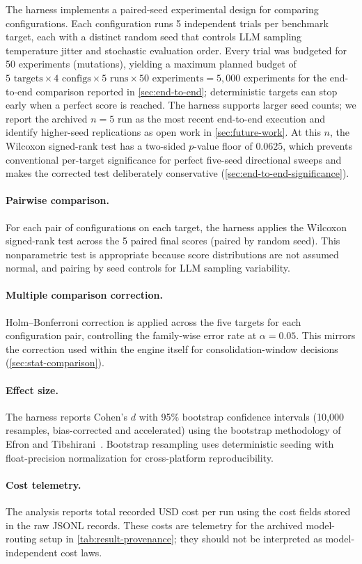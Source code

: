 The harness implements a paired-seed experimental design for comparing configurations.
Each configuration runs 5 independent trials per benchmark target, each with a distinct random seed that controls LLM sampling temperature jitter and stochastic evaluation order.
Every trial was budgeted for 50 experiments (mutations), yielding a maximum planned budget of $5 \text{ targets} \times 4 \text{ configs} \times 5 \text{ runs} \times 50 \text{ experiments} = 5{,}000$ experiments for the end-to-end comparison reported in \cref{sec:end-to-end}; deterministic targets can stop early when a perfect score is reached.
The harness supports larger seed counts; we report the archived $n = 5$ run as the most recent end-to-end execution and identify higher-seed replications as open work in \cref{sec:future-work}.
At this $n$, the Wilcoxon signed-rank test has a two-sided $p$-value floor of $0.0625$, which prevents conventional per-target significance for perfect five-seed directional sweeps and makes the corrected test deliberately conservative (\cref{sec:end-to-end-significance}).

\paragraph{Pairwise comparison.}
For each pair of configurations on each target, the harness applies the Wilcoxon signed-rank test across the 5 paired final scores (paired by random seed).
This nonparametric test is appropriate because score distributions are not assumed normal, and pairing by seed controls for LLM sampling variability.

\paragraph{Multiple comparison correction.}
Holm--Bonferroni correction is applied across the five targets for each configuration pair, controlling the family-wise error rate at $\alpha = 0.05$.
This mirrors the correction used within the engine itself for consolidation-window decisions (\cref{sec:stat-comparison}).

\paragraph{Effect size.}
The harness reports Cohen's $d$ with 95\% bootstrap confidence intervals (10{,}000 resamples, bias-corrected and accelerated) using the bootstrap methodology of Efron and Tibshirani~\cite{efron1994bootstrap}.
Bootstrap resampling uses deterministic seeding with float-precision normalization for cross-platform reproducibility.

\paragraph{Cost telemetry.}
The analysis reports total recorded USD cost per run using the cost fields stored in the raw JSONL records.
These costs are telemetry for the archived model-routing setup in \cref{tab:result-provenance}; they should not be interpreted as model-independent cost laws.
